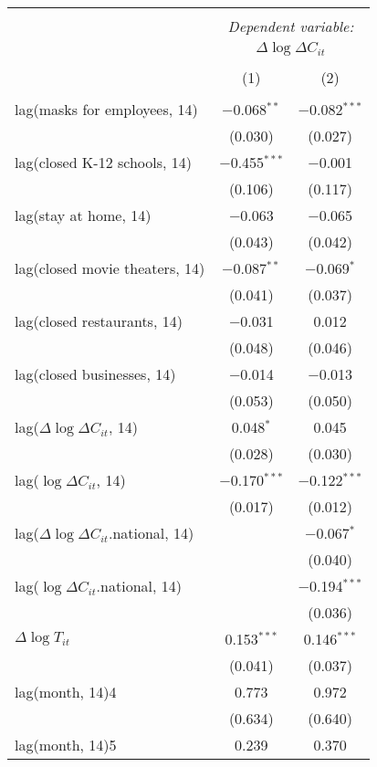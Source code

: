 \begin{tabular}{@{\extracolsep{1pt}}lcc} 
\\[-1.8ex]\hline 
\hline \\[-1.8ex] 
 & \multicolumn{2}{c}{\textit{Dependent variable:}} \\ 
\cline{2-3} 
 & \multicolumn{2}{c}{$\Delta \log \Delta C_{it}$} \\ 
\\[-1.8ex] & (1) & (2)\\ 
\hline \\[-1.8ex] 
 lag(masks for employees, 14) & $-$0.068$^{**}$ & $-$0.082$^{***}$ \\ 
  & (0.030) & (0.027) \\ 
  lag(closed K-12 schools, 14) & $-$0.455$^{***}$ & $-$0.001 \\ 
  & (0.106) & (0.117) \\ 
  lag(stay at home, 14) & $-$0.063 & $-$0.065 \\ 
  & (0.043) & (0.042) \\ 
  lag(closed movie theaters, 14) & $-$0.087$^{**}$ & $-$0.069$^{*}$ \\ 
  & (0.041) & (0.037) \\ 
  lag(closed restaurants, 14) & $-$0.031 & 0.012 \\ 
  & (0.048) & (0.046) \\ 
  lag(closed businesses, 14) & $-$0.014 & $-$0.013 \\ 
  & (0.053) & (0.050) \\ 
  lag($\Delta \log \Delta C_{it}$, 14) & 0.048$^{*}$ & 0.045 \\ 
  & (0.028) & (0.030) \\ 
  lag($\log \Delta C_{it}$, 14) & $-$0.170$^{***}$ & $-$0.122$^{***}$ \\ 
  & (0.017) & (0.012) \\ 
  lag($\Delta \log \Delta C_{it}$.national, 14) &  & $-$0.067$^{*}$ \\ 
  &  & (0.040) \\ 
  lag($\log \Delta C_{it}$.national, 14) &  & $-$0.194$^{***}$ \\ 
  &  & (0.036) \\ 
  $\Delta \log T_{it}$ & 0.153$^{***}$ & 0.146$^{***}$ \\ 
  & (0.041) & (0.037) \\ 
  lag(month, 14)4 & 0.773 & 0.972 \\ 
  & (0.634) & (0.640) \\ 
  lag(month, 14)5 & 0.239 & 0.370 \\ 

\end{tabular}
